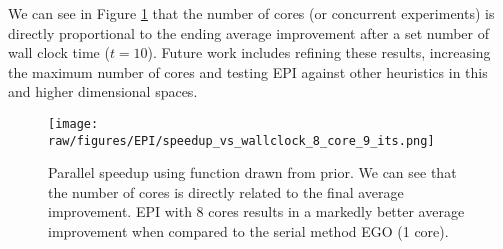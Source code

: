 We can see in Figure \ref{fig:EPI_res1} that the number of cores (or concurrent experiments) is directly proportional to the ending average improvement after a set number of wall clock time ($t = 10$). Future work includes refining these results, increasing the maximum number of cores and testing EPI against other heuristics in this and higher dimensional spaces.

\begin{figure}[hpt]
 	\centerline{\texttt{[image: raw/figures/EPI/speedup\_vs\_wallclock\_8\_core\_9\_its.png]}}
    \caption[Parallel speedup for function drawn from prior]{Parallel speedup using function drawn from prior. We can see that the number of cores is directly related to the final average improvement. EPI with 8 cores results in a markedly better average improvement when compared to the serial method EGO (1 core).}
 	\label{fig:EPI_res1}
\end{figure}




%
%
%
%

